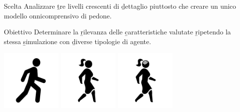 \begin{block}{Scelta}
    Analizzare \b{tre livelli} crescenti di \b{dettaglio} piuttosto che creare un unico modello onnicomprensivo di pedone.
\end{block}

\begin{block}{Obiettivo}
    Determinare la \b{rilevanza} delle \b{caratteristiche} valutate \b{ripetendo} la stessa \b{simulazione} con \b{diverse tipologie} di agente.
\end{block}

\hfil\hfil\includegraphics[width=3cm]{images/homogeneous-pedestrian.png}
\hfil\hfil\includegraphics[width=3cm]{images/heterogeneous-pedestrian.png}
\hfil\hfil\includegraphics[width=3cm]{images/cognitive-pedestrian.png}\newline
\null
\hfil\hfil{}
\hfil\hfil{}
\hfil\hfil{}